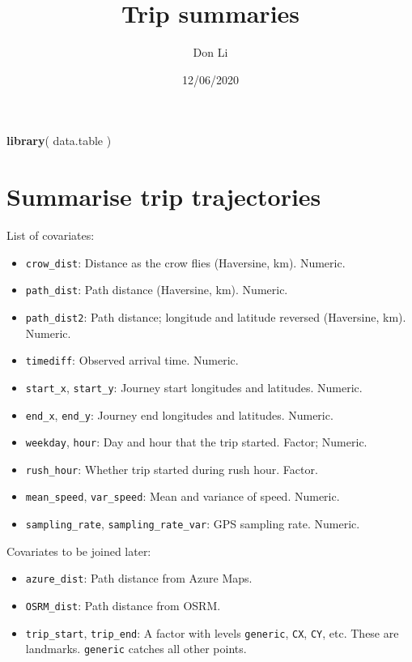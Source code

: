 \documentclass[]{article}
\title{Trip summaries}
\author{Don Li}
\date{12/06/2020}
\newenvironment{Shaded}{\begin{snugshade}}{\end{snugshade}}
\newcommand{\KeywordTok}[1]{\textcolor[rgb]{0.13,0.29,0.53}{\textbf{#1}}}
\newcommand{\NormalTok}[1]{#1}
\providecommand{\tightlist}{%
  \setlength{\itemsep}{0pt}\setlength{\parskip}{0pt}}
\begin{document}
\maketitle

\begin{Shaded}
\begin{Highlighting}[]
\KeywordTok{library}\NormalTok{( data.table )}
\end{Highlighting}
\end{Shaded}

\hypertarget{summarise-trip-trajectories}{%
\section{Summarise trip
trajectories}\label{summarise-trip-trajectories}}

List of covariates:

\begin{itemize}
\tightlist
\item
  \texttt{crow\_dist}: Distance as the crow flies (Haversine, km).
  Numeric.
\item
  \texttt{path\_dist}: Path distance (Haversine, km). Numeric.
\item
  \texttt{path\_dist2}: Path distance; longitude and latitude reversed
  (Haversine, km). Numeric.
\item
  \texttt{timediff}: Observed arrival time. Numeric.
\item
  \texttt{start\_x}, \texttt{start\_y}: Journey start longitudes and
  latitudes. Numeric.
\item
  \texttt{end\_x}, \texttt{end\_y}: Journey end longitudes and
  latitudes. Numeric.
\item
  \texttt{weekday}, \texttt{hour}: Day and hour that the trip started.
  Factor; Numeric.
\item
  \texttt{rush\_hour}: Whether trip started during rush hour. Factor.
\item
  \texttt{mean\_speed}, \texttt{var\_speed}: Mean and variance of speed.
  Numeric.
\item
  \texttt{sampling\_rate}, \texttt{sampling\_rate\_var}: GPS sampling
  rate. Numeric.
\end{itemize}

Covariates to be joined later:

\begin{itemize}
\tightlist
\item
  \texttt{azure\_dist}: Path distance from Azure Maps.
\item
  \texttt{OSRM\_dist}: Path distance from OSRM.
\item
  \texttt{trip\_start}, \texttt{trip\_end}: A factor with levels
  \texttt{generic}, \texttt{CX}, \texttt{CY}, etc. These are landmarks.
  \texttt{generic} catches all other points.
\end{itemize}
\end{document}
